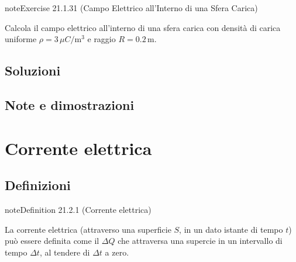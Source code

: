 \documentclass[letterpaper,10pt,italian]{jupyterBook}
\begin{document}
\begin{sphinxadmonition}{note}{Exercise 21.1.31 (Campo Elettrico all’Interno di una Sfera Carica)}



\sphinxAtStartPar
Calcola il campo elettrico all’interno di una sfera carica con densità di carica uniforme \(\rho = 3 \, \mu C/\text{m}^3\) e raggio \(R = 0.2 \, \text{m}\).
\end{sphinxadmonition}



\begin{sphinxVerbatim}[commandchars=\\\{\}]

\end{sphinxVerbatim}

\sphinxstepscope


\subsection{Soluzioni}
\label{\detokenize{ch/electromagnetism/electrostatics-sol:soluzioni}}\label{\detokenize{ch/electromagnetism/electrostatics-sol:physics-hs-electromagnetism-electrostatics-sol}}\label{\detokenize{ch/electromagnetism/electrostatics-sol::doc}}
\sphinxstepscope


\subsection{Note e dimostrazioni}
\label{\detokenize{ch/electromagnetism/electrostatics-notes:note-e-dimostrazioni}}\label{\detokenize{ch/electromagnetism/electrostatics-notes:physics-hs-electromagnetism-electrostatics-notes}}\label{\detokenize{ch/electromagnetism/electrostatics-notes::doc}}


\sphinxstepscope


\section{Corrente elettrica}
\label{\detokenize{ch/electromagnetism/electric-current:corrente-elettrica}}\label{\detokenize{ch/electromagnetism/electric-current:physics-hs-electromagnetism-electric-current}}\label{\detokenize{ch/electromagnetism/electric-current::doc}}



\subsection{Definizioni}
\label{\detokenize{ch/electromagnetism/electric-current:definizioni}}\label{ch/electromagnetism/electric-current:electric-current}
\begin{sphinxadmonition}{note}{Definition 21.2.1 (Corrente elettrica)}



\sphinxAtStartPar
La corrente elettrica (attraverso una superficie \(S\), in un dato istante di tempo \(t\)) può essere definita come il  \(\Delta Q\) che attraversa una supercie in un intervallo di tempo \(\Delta t\), al tendere di \(\Delta t\) a zero.
\end{sphinxadmonition}
\end{document}
